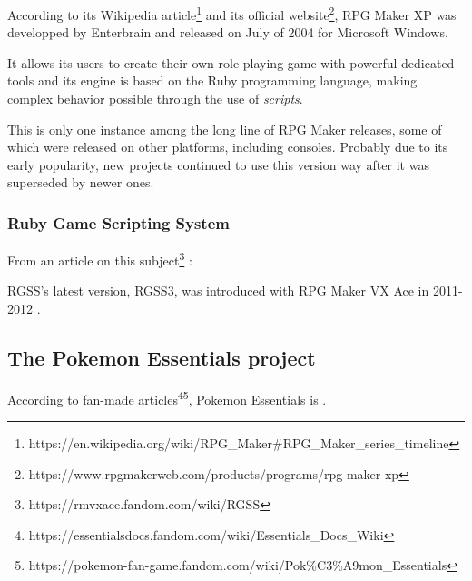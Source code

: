\documentclass[11pt]{article}
\begin{document}
According to its Wikipedia article\footnote{https://en.wikipedia.org/wiki/RPG\_Maker\#RPG\_Maker\_series\_timeline} and its official website\footnote{https://www.rpgmakerweb.com/products/programs/rpg-maker-xp}, RPG Maker XP was developped by Enterbrain and released on July of 2004 for Microsoft Windows. 

It allows its users to create their own role-playing game with powerful dedicated tools and its engine is based on the Ruby programming language, making complex behavior possible through the use of \textit{scripts}.


This is only one instance among the long line of RPG Maker releases, some of which were released on other platforms, including consoles. Probably due to its early popularity, new projects continued to use this version way after it was superseded by newer ones.



\subsubsection{Ruby Game Scripting System}

From an article on this subject\footnote{https://rmvxace.fandom.com/wiki/RGSS} : 


RGSS's latest version, RGSS3, was introduced with RPG Maker VX Ace in 2011-2012 \cite{rgssspec,rmvxacerelease}.






\subsection{The Pokemon Essentials project}


According to fan-made articles\footnote{https://essentialsdocs.fandom.com/wiki/Essentials\_Docs\_Wiki}\footnote{https://pokemon-fan-game.fandom.com/wiki/Pok\%C3\%A9mon\_Essentials}, Pokemon Essentials is .
\end{document}
